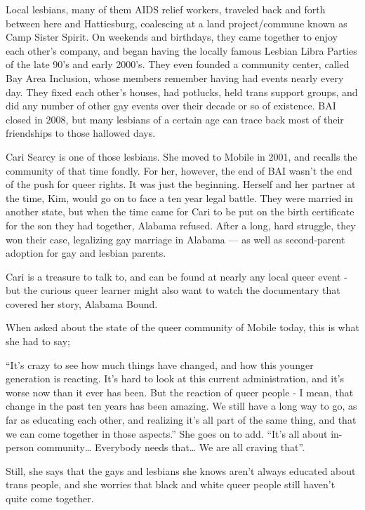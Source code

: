 \documentclass[
]{book}
\begin{document}
Local lesbians, many of them AIDS relief workers, traveled back and forth between here and Hattiesburg, coalescing at a land project/commune known as Camp Sister Spirit. On weekends and birthdays, they came together to enjoy each other's company, and began having the locally famous Lesbian Libra Parties of the late 90's and early 2000's. They even founded a community center, called Bay Area Inclusion, whose members remember having had events nearly every day. They fixed each other's houses, had potlucks, held trans support groups, and did any number of other gay events over their decade or so of existence. BAI closed in 2008, but many lesbians of a certain age can trace back most of their friendships to those hallowed days.

Cari Searcy is one of those lesbians. She moved to Mobile in 2001, and recalls the community of that time fondly. For her, however, the end of BAI wasn't the end of the push for queer rights. It was just the beginning. Herself and her partner at the time, Kim, would go on to face a ten year legal battle. They were married in another state, but when the time came for Cari to be put on the birth certificate for the son they had together, Alabama refused. After a long, hard struggle, they won their case, legalizing gay marriage in Alabama --- as well as second-parent adoption for gay and lesbian parents.

Cari is a treasure to talk to, and can be found at nearly any local queer event - but the curious queer learner might also want to watch the documentary that covered her story, Alabama Bound.

When asked about the state of the queer community of Mobile today, this is what she had to say;

``It's crazy to see how much things have changed, and how this younger generation is reacting. It's hard to look at this current administration, and it's worse now than it ever has been. But the reaction of queer people - I mean, that change in the past ten years has been amazing. We still have a long way to go, as far as educating each other, and realizing it's all part of the same thing, and that we can come together in those aspects.'' She goes on to add. ``It's all about in-person community\ldots{} Everybody needs that\ldots{} We are all craving that''.

Still, she says that the gays and lesbians she knows aren't always educated about trans people, and she worries that black and white queer people still haven't quite come together.
\end{document}
